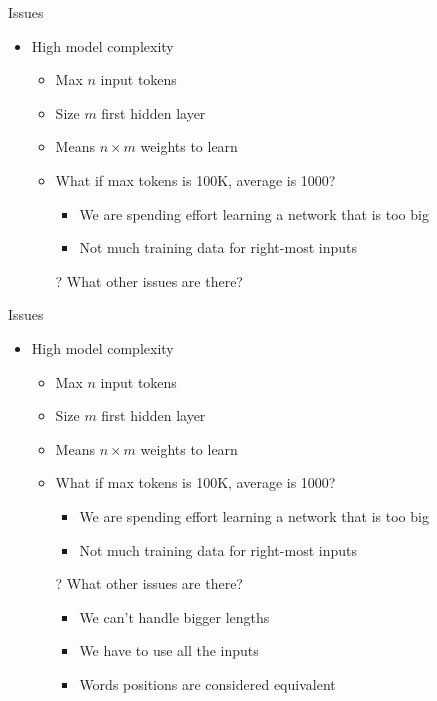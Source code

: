 \documentclass[aspectratio=169]{beamer}
\begin{document}
\begin{frame}{Issues}

\begin{itemize}
	\item High model complexity
	\begin{itemize}
	\item Max $n$ input tokens
	\item Size $m$ first hidden layer
	\item Means $n \times m$ weights to learn
	\item What if max tokens is 100K, average is 1000?
	\begin{itemize}
	\item We are spending effort learning a network that is too big
	\item Not much training data for right-most inputs
	\end{itemize}
	\item[?] What other issues are there? 
	\end{itemize}
\end{itemize}
\end{frame}
\begin{frame}{Issues}

\begin{itemize}
	\item High model complexity
	\begin{itemize}
	\item Max $n$ input tokens
	\item Size $m$ first hidden layer
	\item Means $n \times m$ weights to learn
	\item What if max tokens is 100K, average is 1000?
	\begin{itemize}
	\item We are spending effort learning a network that is too big
	\item Not much training data for right-most inputs
	\end{itemize}
	\item[?] What other issues are there? 
	\begin{itemize}
	\item We can't handle bigger lengths
	\item We have to use all the inputs
	\item Words positions are considered equivalent
	\end{itemize}
	\end{itemize}
\end{itemize}
\end{frame}
\end{document}
